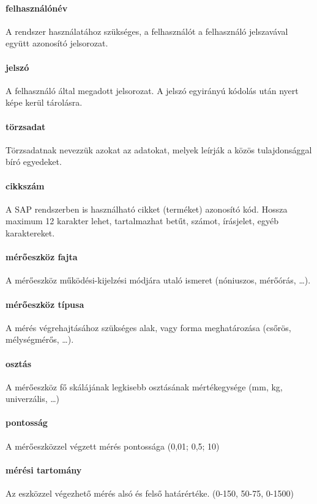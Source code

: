 \paragraph*{felhasználónév} A rendszer használatához szükséges, a felhasználót a 
felhasználó jelszavával együtt azonosító jelsorozat.

\paragraph*{jelszó} A felhasználó által megadott jelsorozat. A jelszó egyirányú kódolás
után nyert képe kerül tárolásra.

\paragraph*{törzsadat} Törzsadatnak nevezzük azokat az adatokat, melyek leírják a közös
tulajdonsággal bíró egyedeket.

\paragraph*{cikkszám} A SAP rendszerben is használható cikket (terméket) azonosító
kód. Hossza maximum 12 karakter lehet, tartalmazhat betűt, számot, írásjelet, egyéb 
karaktereket. 

\paragraph*{mérőeszköz fajta} A mérőeszköz működési-kijelzési módjára utaló ismeret
(nóniuszos, mérőórás, \dots).

\paragraph*{mérőeszköz típusa} A mérés végrehajtásához szükséges alak, vagy forma meghatározása (csőrös, mélységmérős, \dots).

\paragraph*{osztás} A mérőeszköz fő skálájának legkisebb osztásának mértékegysége 
(mm, kg, univerzális, \dots)

\paragraph*{pontosság} A mérőeszközzel végzett mérés pontossága (0,01; 0,5; 10)

\paragraph*{mérési tartomány} Az eszközzel végezhető mérés alsó és felső határértéke.
(0-150, 50-75, 0-1500)

